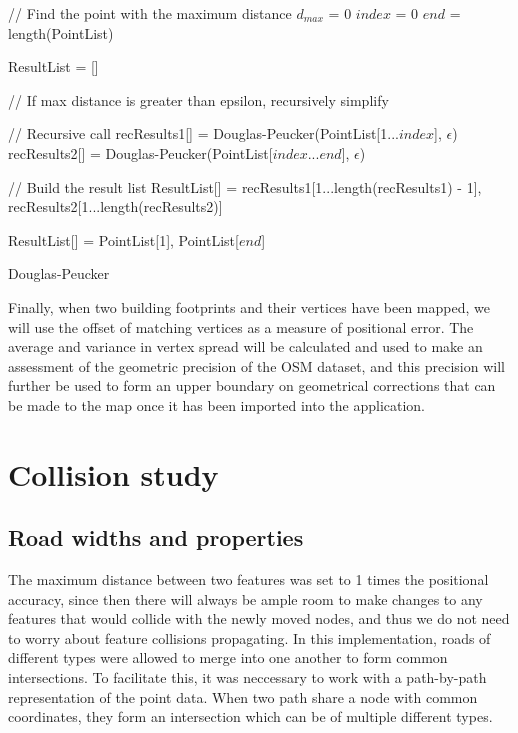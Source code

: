 \documentclass{kththesis}
\begin{document}
\begin{algorithm}[H]
\SetAlgoLined
{}
    // Find the point with the maximum distance\;
    $d_{max}$ = 0\;
    $index$ = 0\;
    $end$ = length(PointList)\;
    

    ResultList = []\;
    
    // If max distance is greater than epsilon, recursively simplify\;
     {
        // Recursive call\;
        recResults1[] = Douglas-Peucker(PointList[1...$index$], $\epsilon$)\;
        recResults2[] = Douglas-Peucker(PointList[$index$...$end$], $\epsilon$)\;

        // Build the result list\;
        ResultList[] = {recResults1[1...length(recResults1) - 1], recResults2[1...length(recResults2)]}\;
    }{
        ResultList[] = {PointList[1], PointList[$end$]}\;
    }
    \;

    \caption{Douglas-Peucker}
\end{algorithm}

Finally, when two building footprints and their vertices have been mapped, we will use the offset of matching vertices as a measure of positional error. The average and variance in vertex spread will be calculated and used to make an assessment of the geometric precision of the OSM dataset, and this precision will further be used to form an upper boundary on geometrical corrections that can be made to the map once it has been imported into the application.

\section{Collision study}

\subsection{Road widths and properties}

The maximum distance between two features was set to 1 times the positional accuracy, since then there will always be ample room to make changes to any features that would collide with the newly moved nodes, and thus we do not need to worry about feature collisions propagating.
In this implementation, roads of different types were allowed to merge into one another to form common intersections.
To facilitate this, it was neccessary to work with a path-by-path representation of the point data.
When two path share a node with common coordinates, they form an intersection which can be of multiple different types.
\end{document}
